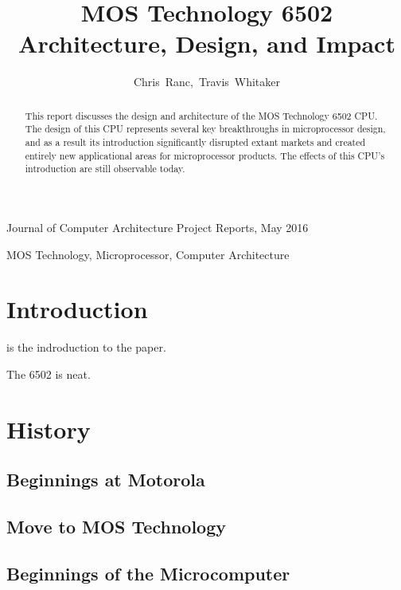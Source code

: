 \documentclass[journal]{IEEEtran}
\begin{document}
\title{MOS Technology 6502 \\ Architecture, Design, and Impact}

\author{Chris~Ranc,~Travis~Whitaker}

{Journal of Computer Architecture Project Reports, May 2016}

\maketitle

\begin{abstract}
This report discusses the design and architecture of the MOS Technology 6502
CPU. The design of this CPU represents several key breakthroughs in
microprocessor design, and as a result its introduction significantly disrupted
extant markets and created entirely new applicational areas for microprocessor
products. The effects of this CPU's introduction are still observable today.
\end{abstract}

\begin{IEEEkeywords}
MOS Technology, Microprocessor, Computer Architecture
\end{IEEEkeywords}

\IEEEpeerreviewmaketitle

\section{Introduction}

 is the indroduction to the paper.

The 6502 is neat.

\section{History}

\subsection{Beginnings at Motorola}

\subsection{Move to MOS Technology}

\subsection{Beginnings of the Microcomputer}
\end{document}

